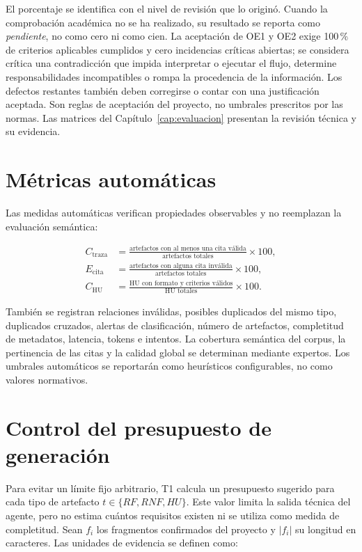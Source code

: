 El porcentaje se identifica con el nivel de revisión que lo originó. Cuando la comprobación académica no se ha realizado, su resultado se reporta como \emph{pendiente}, no como cero ni como cien. La aceptación de OE1 y OE2 exige 100\,\% de criterios aplicables cumplidos y cero incidencias críticas abiertas; se considera crítica una contradicción que impida interpretar o ejecutar el flujo, determine responsabilidades incompatibles o rompa la procedencia de la información. Los defectos restantes también deben corregirse o contar con una justificación aceptada. Son reglas de aceptación del proyecto, no umbrales prescritos por las normas. Las matrices del Capítulo~\ref{cap:evaluacion} presentan la revisión técnica y su evidencia.

\section{Métricas automáticas}

Las medidas automáticas verifican propiedades observables y no reemplazan la evaluación semántica:

\begin{align}
  C_{\mathrm{traza}} &=
  \frac{\text{artefactos con al menos una cita válida}}
       {\text{artefactos totales}}\times 100, \\
  E_{\mathrm{cita}} &=
  \frac{\text{artefactos con alguna cita inválida}}
       {\text{artefactos totales}}\times 100, \\
  C_{\mathrm{HU}} &=
  \frac{\text{HU con formato y criterios válidos}}
       {\text{HU totales}}\times 100.
\end{align}

También se registran relaciones inválidas, posibles duplicados del mismo tipo, duplicados cruzados, alertas de clasificación, número de artefactos, completitud de metadatos, latencia, tokens e intentos. La cobertura semántica del corpus, la pertinencia de las citas y la calidad global se determinan mediante expertos. Los umbrales automáticos se reportarán como heurísticos configurables, no como valores normativos.

\section{Control del presupuesto de generación}

Para evitar un límite fijo arbitrario, T1 calcula un presupuesto sugerido para cada tipo de artefacto \(t\in\{RF,RNF,HU\}\). Este valor limita la salida técnica del agente, pero no estima cuántos requisitos existen ni se utiliza como medida de completitud. Sean \(f_i\) los fragmentos confirmados del proyecto y \(\lvert f_i\rvert\) su longitud en caracteres. Las unidades de evidencia se definen como:

